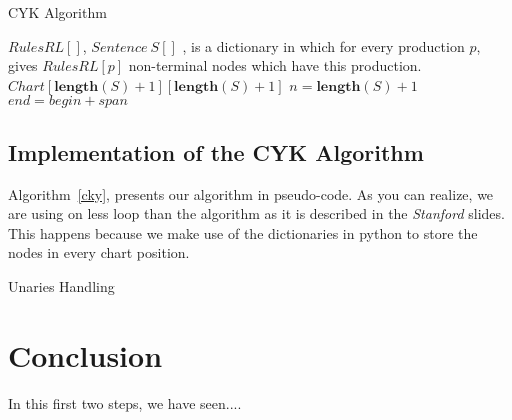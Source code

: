 \documentclass[a4paper,11pt]{article}
\begin{document}
\begin{algorithm}[t!]
\caption{CYK Algorithm}
\label{cky}
\begin{small}
\begin{algorithmic}[1]
$RulesRL[]$, $Sentence\ S[]$
, is a dictionary in which for every production $p$, gives $RulesRL[p]$ non-terminal nodes which have this production.
$Chart[\textbf{length}(S)+1][\textbf{length}(S)+1]$
\ELSE
{}
\ENDFOR
\ENDIF
{}
\ENDFOR
\STATE $n = \textbf{length}(S) + 1$
\STATE $end = begin + span$
\ENDFOR
\ENDFOR
\ENDFOR
\ENDFOR
{}
\ENDFOR
\ENDFOR
\end{algorithmic}
\end{small}
\end{algorithm}

\subsection{Implementation of the CYK Algorithm}
Algorithm~\ref{cky}, presents our algorithm in pseudo-code. As you can realize, we are using on less loop than the algorithm as it is described in the \textit{Stanford} slides. This happens because we make use of the dictionaries in python to store the nodes in every chart position. 

\begin{algorithm}[t!]
\caption{Unaries Handling}
\label{unaries}
\begin{small}
\begin{algorithmic}[1]
\STATE
\end{algorithmic}
\end{small}
\end{algorithm}


\section{Conclusion}
\label{concl}
In this first two steps, we have seen....
\end{document}
